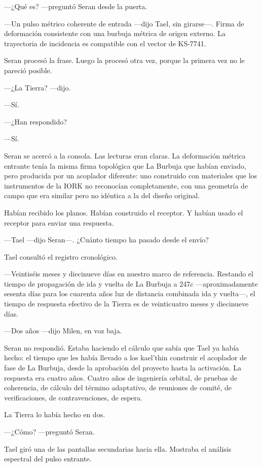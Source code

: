 \documentclass[11pt,a5paper,twoside]{book}
\begin{document}
—¿Qué es? —preguntó Seran desde la puerta.

—Un pulso métrico coherente de entrada —dijo Tael, sin girarse—. Firma de deformación consistente con una burbuja métrica de origen externo. La trayectoria de incidencia es compatible con el vector de KS-7741.

Seran procesó la frase. Luego la procesó otra vez, porque la primera vez no le pareció posible.

—¿La Tierra? —dijo.

—Sí.

—¿Han respondido?

—Sí.

Seran se acercó a la consola. Las lecturas eran claras. La deformación métrica entrante tenía la misma firma topológica que La Burbuja que habían enviado, pero producida por un acoplador diferente: uno construido con materiales que los instrumentos de la IORK no reconocían completamente, con una geometría de campo que era similar pero no idéntica a la del diseño original.

Habían recibido los planos. Habían construido el receptor. Y habían usado el receptor para enviar una respuesta.

—Tael —dijo Seran—. ¿Cuánto tiempo ha pasado desde el envío?

Tael consultó el registro cronológico.

—Veintiséis meses y diecinueve días en nuestro marco de referencia. Restando el tiempo de propagación de ida y vuelta de La Burbuja a 247c —aproximadamente sesenta días para los cuarenta años luz de distancia combinada ida y vuelta—, el tiempo de respuesta efectivo de la Tierra es de veinticuatro meses y diecinueve días.

—Dos años —dijo Milen, en voz baja.

Seran no respondió. Estaba haciendo el cálculo que sabía que Tael ya había hecho: el tiempo que les había llevado a los kael'thin construir el acoplador de fase de La Burbuja, desde la aprobación del proyecto hasta la activación. La respuesta era cuatro años. Cuatro años de ingeniería orbital, de pruebas de coherencia, de cálculo del término adaptativo, de reuniones de comité, de verificaciones, de contravenciones, de espera.

La Tierra lo había hecho en dos.

—¿Cómo? —preguntó Seran.

Tael giró una de las pantallas secundarias hacia ella. Mostraba el análisis espectral del pulso entrante.
\end{document}
